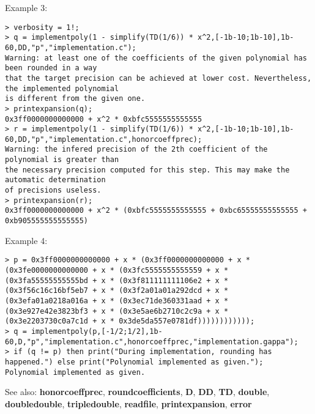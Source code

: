 \noindent Example 3: 
\begin{center}\begin{minipage}{14.8cm}\begin{Verbatim}[frame=single]
> verbosity = 1!;
> q = implementpoly(1 - simplify(TD(1/6)) * x^2,[-1b-10;1b-10],1b-60,DD,"p","implementation.c");
Warning: at least one of the coefficients of the given polynomial has been rounded in a way
that the target precision can be achieved at lower cost. Nevertheless, the implemented polynomial
is different from the given one.
> printexpansion(q);
0x3ff0000000000000 + x^2 * 0xbfc5555555555555
> r = implementpoly(1 - simplify(TD(1/6)) * x^2,[-1b-10;1b-10],1b-60,DD,"p","implementation.c",honorcoeffprec);
Warning: the infered precision of the 2th coefficient of the polynomial is greater than
the necessary precision computed for this step. This may make the automatic determination
of precisions useless.
> printexpansion(r);
0x3ff0000000000000 + x^2 * (0xbfc5555555555555 + 0xbc65555555555555 + 0xb905555555555555)
\end{Verbatim}
\end{minipage}\end{center}
\noindent Example 4: 
\begin{center}\begin{minipage}{14.8cm}\begin{Verbatim}[frame=single]
> p = 0x3ff0000000000000 + x * (0x3ff0000000000000 + x * (0x3fe0000000000000 + x * (0x3fc5555555555559 + x * (0x3fa55555555555bd + x * (0x3f811111111106e2 + x * (0x3f56c16c16bf5eb7 + x * (0x3f2a01a01a292dcd + x * (0x3efa01a0218a016a + x * (0x3ec71de360331aad + x * (0x3e927e42e3823bf3 + x * (0x3e5ae6b2710c2c9a + x * (0x3e2203730c0a7c1d + x * 0x3de5da557e0781df))))))))))));
> q = implementpoly(p,[-1/2;1/2],1b-60,D,"p","implementation.c",honorcoeffprec,"implementation.gappa");
> if (q != p) then print("During implementation, rounding has happened.") else print("Polynomial implemented as given.");	
Polynomial implemented as given.
\end{Verbatim}
\end{minipage}\end{center}
See also: \textbf{honorcoeffprec}, \textbf{roundcoefficients}, \textbf{D}, \textbf{DD}, \textbf{TD}, \textbf{double}, \textbf{doubledouble}, \textbf{tripledouble}, \textbf{readfile}, \textbf{printexpansion}, \textbf{error}
